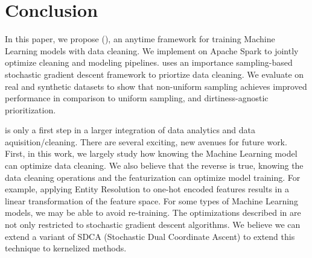 \section{Conclusion}
In this paper, we propose \sysfull (\sys), an anytime framework for training Machine Learning models with data cleaning.
We implement \sys on Apache Spark to jointly optimize cleaning and modeling pipelines.
\sys uses an importance sampling-based stochastic gradient descent framework to priortize data cleaning.
We evaluate \sysfull on real and synthetic datasets to show that non-uniform sampling achieves improved performance in comparison to uniform sampling, and dirtiness-agnostic prioritization.

\sys is only a first step in a larger integration of data analytics and data aquisition/cleaning. 
There are several exciting, new avenues for future work.
First, in this work, we largely study how knowing the Machine Learning model can optimize data cleaning.
We also believe that the reverse is true, knowing the data cleaning operations and the featurization can optimize model training.
For example, applying Entity Resolution to one-hot encoded features results in a linear transformation of the feature space.
For some types of Machine Learning models, we may be able to avoid re-training.
The optimizations described in \sys are not only restricted to stochastic gradient descent algorithms. 
We believe we can extend a variant of SDCA (Stochastic Dual Coordinate Ascent) \cite{jaggi2014communication} to extend this technique to kernelized methods.

